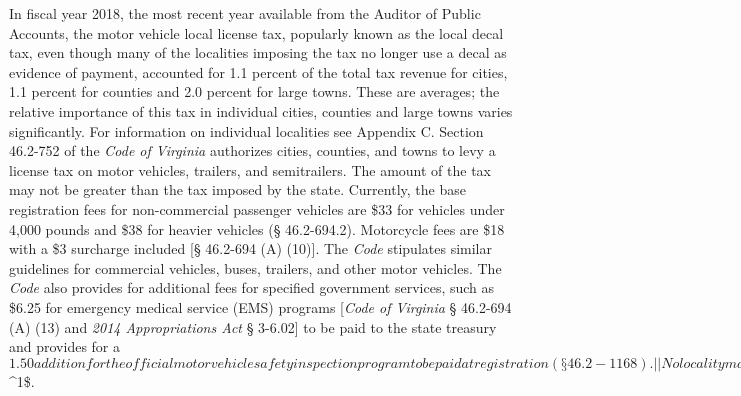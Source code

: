 \documentclass[
]{book}
\begin{document}
In fiscal year 2018, the most recent year available from the Auditor of Public Accounts, the motor vehicle local license tax, popularly known as the local decal tax, even though many of the localities imposing the tax no longer use a decal as evidence of payment, accounted for 1.1 percent of the total tax revenue for cities, 1.1 percent for counties and 2.0 percent for large towns. These are averages; the relative importance of this tax in individual cities, counties and large towns varies significantly. For information on individual localities see Appendix C.
\textbar{}
\textbar{} Section 46.2-752 of the \emph{Code of Virginia} authorizes cities, counties, and towns to levy a license tax on motor vehicles, trailers, and semitrailers. The amount of the tax may not be greater than the tax imposed by the state. Currently, the base registration fees for non-commercial passenger vehicles are \$33 for vehicles under 4,000 pounds and \$38 for heavier vehicles (§ 46.2-694.2). Motorcycle fees are \$18 with a \$3 surcharge included {[}§ 46.2-694 (A) (10){]}. The \emph{Code} stipulates similar guidelines for commercial vehicles, buses, trailers, and other motor vehicles. The \emph{Code} also provides for additional fees for specified government services, such as \$6.25 for emergency medical service (EMS) programs {[}\emph{Code of Virginia} § 46.2-694 (A) (13) and \emph{2014 Appropriations Act} § 3-6.02{]} to be paid to the state treasury and provides for a \(1.50 addition for the official motor vehicle safety inspection program to be paid at registration (§ 46.2-1168). | | No locality may impose a license tax on any vehicle when the owner pays a similar tax to the locality in which the vehicle is normally stored. Furthermore, no locality may impose a local license tax on any vehicle that is owned by a nonresident of such locality and is used exclusively for pleasure or personal transportation (i.e., for non-business uses). For example, the tax would not apply to a personal vehicle owned by a nonresident college student and used only for pleasure or personal transportation. Vehicles used for state business by nonresident officials, dealer demonstration vehicles and the vehicles of common carriers are also exempt from local license taxes. | | The situs for the assessment of motor vehicles is clarified in § 58.1.3511. Business vehicles with a weight of 10,000 pounds or less are considered to be in the jurisdiction in which the owner of the business: (1) is required to file a tangible personal property tax return for any vehicle used in the business, and (2) has a definite place of business from which the use of the business vehicle is directed or controlled. | | If a town within a county levies a motor vehicle license tax, the county must credit the owner with the tax paid to the town. Also, if the town tax is equal to the maximum allowed by law, then the county may not impose any further tax. Likewise, no county license tax may be imposed on vehicles that are subject to license taxes imposed by a town constituting a separate school division (§46.2-752)\)\^{}1\$.
\end{document}
